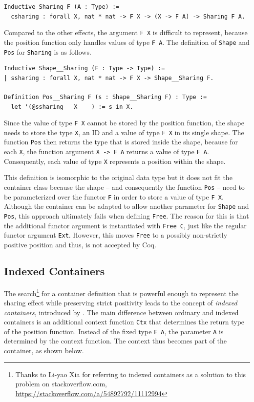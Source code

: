 \documentclass[a4paper, 11pt, fleqn, twoside, abstract=on]{scrreprt}
\newcommand{\hinl}[1]{\texttt{#1}}
\newcommand{\cinl}[1]{\texttt{#1}}
\begin{document}
\begin{verbatim}
Inductive Sharing F (A : Type) :=
  csharing : forall X, nat * nat -> F X -> (X -> F A) -> Sharing F A.
\end{verbatim}
\noindent
Compared to the other effects, the argument \hinl{F X} is difficult to represent, because the position function only handles values of type \hinl{F A}.
The definition of \cinl{Shape} and \cinl{Pos} for \cinl{Sharing} is as follows.

\begin{verbatim}
Inductive Shape__Sharing (F : Type -> Type) :=
| ssharing : forall X, nat * nat -> F X -> Shape__Sharing F.

Definition Pos__Sharing F (s : Shape__Sharing F) : Type :=
  let '(@ssharing _ X _ _) := s in X.
\end{verbatim}
\noindent
Since the value of type \cinl{F X} cannot be stored by the position function, the shape needs to store the type \hinl{X}, an ID and a value of type \hinl{F X} in its single shape.
The function \cinl{Pos} then returns the type that is stored inside the shape, because for each \hinl{X}, the function argument \hinl{X -> F A} returns a value of type \hinl{F A}.
Consequently, each value of type \cinl{X} represents a position within the shape.

This definition is isomorphic to the original data type but it does not fit the container class because the shape -- and consequently the function \cinl{Pos} -- need to be parameterized over the functor \hinl{F} in order to store a value of type \hinl{F X}.
Although the container can be adapted to allow another parameter for \cinl{Shape} and \cinl{Pos}, this approach ultimately fails when defining \cinl{Free}.
The reason for this is that the additional functor argument is instantiated with \cinl{Free C}, just like the regular functor argument \cinl{Ext}.
However, this moves \cinl{Free} to a possibly non-strictly positive position and thus, is not accepted by Coq.

\subsection{Indexed Containers}
The search\footnote{Thanks to Li-yao Xia for referring to indexed containers as a solution to this problem on stackoverflow.com, \url{https://stackoverflow.com/a/54892792/11112994}} for a container definition that is powerful enough to represent the sharing effect while preserving strict positivity leads to the concept of \textit{indexed containers}, introduced by \citet{altenkirch2009indexed}. 
The main difference between ordinary and indexed containers is an additional context function \cinl{Ctx} that determines the return type of the position function.
Instead of the fixed type \hinl{F A}, the parameter \cinl{A} is determined by the context function.
The context thus becomes part of the container, as shown below.
\end{document}
